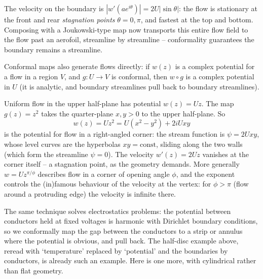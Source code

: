 \begin{example}
\begin{center}
	\end{center}
	The velocity on the boundary is $|w'(ae^{i\theta})| = 2U|\sin\theta|$: the flow is stationary at the front and rear \emph{stagnation points} $\theta = 0, \pi$, and fastest at the top and bottom. Composing with a Joukowski-type map now transports this entire flow field to the flow past an aerofoil, streamline by streamline -- conformality guarantees the boundary remains a streamline.
\end{example}

\begin{example}
	Conformal maps also generate flows directly: if $w(z)$ is a complex potential for a flow in a region $V$, and $g : U \to V$ is conformal, then $w \circ g$ is a complex potential in $U$ (it is analytic, and boundary streamlines pull back to boundary streamlines).

	Uniform flow in the upper half-plane has potential $w(z) = Uz$. The map $g(z) = z^2$ takes the quarter-plane $x, y > 0$ to the upper half-plane. So
	$$
	w(z) = U z^2 = U(x^2 - y^2) + 2iUxy
	$$
	is the potential for flow in a right-angled corner: the stream function is $\psi = 2Uxy$, whose level curves are the hyperbolas $xy = \text{const}$, sliding along the two walls (which form the streamline $\psi = 0$). The velocity $w'(z) = 2Uz$ vanishes at the corner itself -- a stagnation point, as the geometry demands. More generally $w = Uz^{\pi/\phi}$ describes flow in a corner of opening angle $\phi$, and the exponent controls the (in)famous behaviour of the velocity at the vertex: for $\phi > \pi$ (flow around a protruding edge) the velocity is infinite there.
\end{example}

The same technique solves electrostatics problems: the potential between conductors held at fixed voltages is harmonic with Dirichlet boundary conditions, so we conformally map the gap between the conductors to a strip or annulus where the potential is obvious, and pull back. The half-disc example above, reread with `temperature' replaced by `potential' and the boundaries by conductors, is already such an example. Here is one more, with cylindrical rather than flat geometry.

